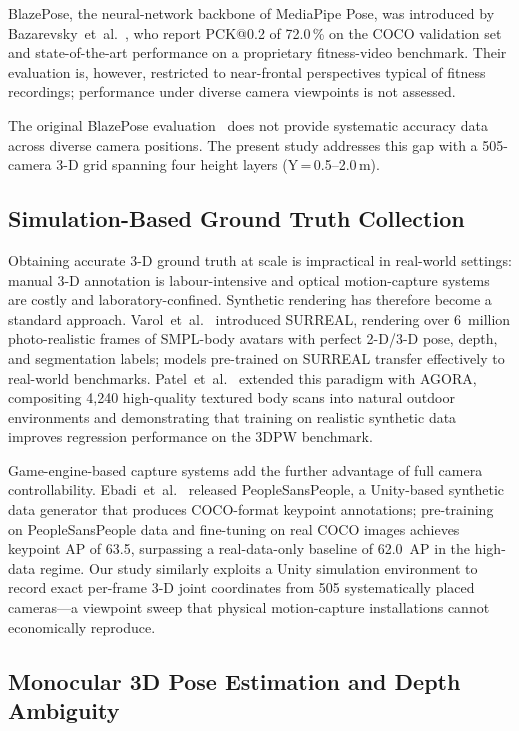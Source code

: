\documentclass[twocolumn]{article}
\begin{document}
BlazePose, the neural-network backbone of MediaPipe Pose, was introduced by
Bazarevsky~et~al.~\cite{blazepose}, who report PCK@0.2 of 72.0\,\% on the
COCO validation set and state-of-the-art performance on a proprietary
fitness-video benchmark. Their evaluation is, however, restricted to
near-frontal perspectives typical of fitness recordings; performance under
diverse camera viewpoints is not assessed.

The original BlazePose evaluation~\cite{blazepose} does not provide
systematic accuracy data across diverse camera positions.
The present study addresses this gap with a
505-camera 3-D grid spanning four height layers (Y\,=\,0.5--2.0\,m).

\subsection{Simulation-Based Ground Truth Collection}

Obtaining accurate 3-D ground truth at scale is impractical in real-world
settings: manual 3-D annotation is labour-intensive and optical
motion-capture systems are costly and laboratory-confined. Synthetic
rendering has therefore become a standard approach. Varol~et~al.~\cite{surreal}
introduced SURREAL, rendering over 6~million photo-realistic frames of
SMPL-body avatars with perfect 2-D/3-D pose, depth, and segmentation labels;
models pre-trained on SURREAL transfer effectively to real-world benchmarks.
Patel~et~al.~\cite{agora} extended this
paradigm with AGORA, compositing 4,240 high-quality textured body scans into
natural outdoor environments and demonstrating that training on realistic
synthetic data improves regression performance on the 3DPW benchmark.

Game-engine-based capture systems add the further advantage of full camera
controllability. Ebadi~et~al.~\cite{peoplesanspeople} released
PeopleSansPeople, a Unity-based synthetic data generator that produces
COCO-format keypoint annotations; pre-training on PeopleSansPeople data and
fine-tuning on real COCO images achieves keypoint AP of 63.5, surpassing a
real-data-only baseline of 62.0~AP in the high-data regime. Our study
similarly exploits a Unity simulation environment to record exact per-frame
3-D joint coordinates from 505 systematically placed cameras---a viewpoint
sweep that physical motion-capture installations cannot economically
reproduce.

\subsection{Monocular 3D Pose Estimation and Depth Ambiguity}
\end{document}
